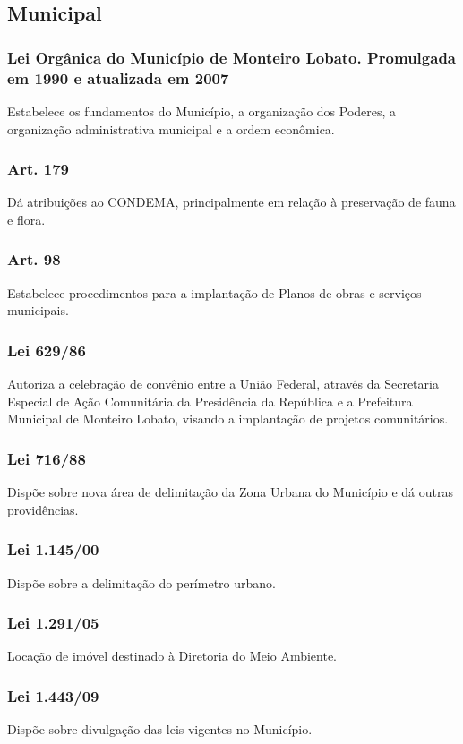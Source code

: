 \begin{subapend}
	\subsection{Municipal}
	\begin{subsubapend}
		\subsubsection{Lei Orgânica do Município de Monteiro Lobato. Promulgada em 1990 e atualizada em 2007}
		Estabelece os fundamentos do Município, a organização dos Poderes, a organização administrativa municipal e a ordem econômica.
		\subsubsection{Art. 179} 
		Dá atribuições ao CONDEMA, principalmente em relação à preservação de fauna e flora.
		\subsubsection{Art. 98}
		Estabelece procedimentos para a implantação de Planos de obras e serviços municipais.
		\subsubsection{Lei 629/86}
		Autoriza a celebração de convênio entre a União Federal, através da Secretaria Especial de Ação Comunitária da Presidência da República e a Prefeitura Municipal de Monteiro Lobato, visando a implantação de projetos comunitários.
		\subsubsection{Lei 716/88}
		Dispõe sobre nova área de delimitação da Zona Urbana do Município e dá outras providências.
		\subsubsection{Lei 1.145/00}
		Dispõe sobre a delimitação do perímetro urbano.
		\subsubsection{Lei 1.291/05}
		Locação de imóvel destinado à Diretoria do Meio Ambiente.
		\subsubsection{Lei 1.443/09}
		Dispõe sobre divulgação das leis vigentes no Município.

\end{subsubapend}
\end{subapend}
